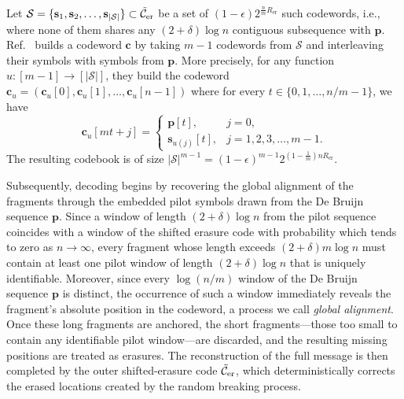 \documentclass[journal,letterpaper,onecolumn,11pt]{IEEEtran}
\newcommand{\cC}{\mathcal{C}}
\newcommand{\cS}{\mathcal{S}}
\newcommand{\boldc}{\mathbf{c}}
\newcommand{\bolds}{\mathbf{s}}
\begin{document}
Let $\cS=\{\bolds_1,\bolds_2,\dots,\bolds_{|\cS|}\}\subset\Tilde{\cC}_{\mathrm{er}}$ be a set of $(1-\epsilon)2^{\frac{n}{m}R_{\mathrm{er}}}$ such codewords, i.e., where none of them shares any $(2+\delta)\log n$ contiguous subsequence with $\mathbf{p}$. 
Ref.~\cite{shomorony2021torn} builds a codeword $\boldc$ by taking $m-1$ codewords %
from $\cS$ and interleaving their symbols with symbols from $\mathbf{p}$. 
More precisely, for any function~$u:[m-1]\to[|\cS|]$, they build the codeword $\boldc_u=(\boldc_u[0],\boldc_u[1],\ldots, \boldc_u[n-1])$ where for every $t\in\{0,1,\dots,n/m-1\}$, we have
\begin{equation}
    \boldc_u[mt+j]=
    \begin{cases}
    \mathbf{p}[t], & j= 0, \\
    \bolds_{u(j)}[t], & j=1, 2,3,\dots,m-1.
\end{cases}
\end{equation}
The resulting codebook is of size $|\cS|^{m-1}=(1-\epsilon)^{m-1}2^{(1-\frac{1}{m})nR_{\mathrm{er}}}$. 

Subsequently, decoding begins by recovering the global alignment of the fragments through the embedded pilot symbols drawn from the De Bruijn sequence $\mathbf{p}$. 
Since a window of length $(2+\delta)\log n$ from the pilot sequence coincides with a window of the shifted erasure code with probability which tends to zero as $n \to \infty$, every fragment whose length exceeds $(2+\delta)m\log n$ must contain at least one pilot window of length $(2+\delta)\log n$ that is uniquely identifiable. 
Moreover, since every $\log(n/m)$ window of the De Bruijn sequence $\mathbf{p}$ is distinct, the occurrence of such a window immediately reveals the fragment’s absolute position in the codeword, a process we call \textit{global alignment}. 
Once these long fragments are anchored, the short fragments—those too small to contain any identifiable pilot window—are discarded, and the resulting missing positions are treated as erasures. 
The reconstruction of the full message is then completed by the outer shifted-erasure code $\Tilde{\cC}_{\mathrm{er}}$, which deterministically corrects the erased locations created by the random breaking process.
\end{document}
